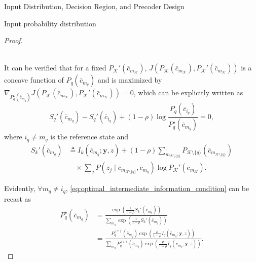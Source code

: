 \documentclass[journal]{IEEEtran}
\begin{document}
\begin{section}{Input Distribution, Decision Region, and Precoder Design}
\begin{subsection}{Input probability distribution}
\begin{proof}
\begin{figure*}[!b]
\begin{align}
						\label{eq:intermediate_information_function}
					\end{align}
				\end{figure*}
				It can be verified that for a fixed $P_{\mathcal{K}}'(\bar{c}_{m_{\mathcal{K}}})$, $J \left( P_{\mathcal{K}}(\bar{c}_{m_{\mathcal{K}}}),P_{\mathcal{K}}'(\bar{c}_{m_{\mathcal{K}}}) \right)$ is a concave function of $P_q(\bar{c}_{m_q})$ and is maximized by $\nabla_{P_q^{\star}(\bar{c}_{m_q})} J \left( P_{\mathcal{K}}(\bar{c}_{m_{\mathcal{K}}}),P_{\mathcal{K}}'(\bar{c}_{m_{\mathcal{K}}}) \right) = 0$, which can be explicitly written as
				\begin{equation}
					S_q'(\bar{c}_{m_q}) - S_q'(\bar{c}_{i_q}) + (1 - \rho) \log \frac{P_q(\bar{c}_{i_q})}{P_q^{\star}(\bar{c}_{m_q})} = 0,
					\label{eq:optimal_intermediate_information_condition}
				\end{equation}
				where $i_q \ne m_q$ is the reference state and
				\begin{align}
					S_k'(\bar{c}_{m_q})
					& \triangleq I_k(\bar{c}_{m_q};\boldsymbol{y},z) + (1 - \rho) \sum_{m_{\mathcal{K} \setminus \{q\}}} P_{\mathcal{K} \setminus \{q\}}(\bar{c}_{m_{\mathcal{K} \setminus \{q\}}})\nonumber\\
					& \quad \times \sum_j P(\bar{z}_j \mid \bar{c}_{m_{\mathcal{K} \setminus \{q\}}},\bar{c}_{m_q}) \log P_{\mathcal{K}}'(\bar{c}_{m_{\mathcal{K}}}).
				\end{align}

				Evidently, $\forall m_q \ne i_q$, \eqref{eq:optimal_intermediate_information_condition} can be recast as
				\begin{subequations}
					\begin{align}
						P_q^{\star}(\bar{c}_{m_q})
						& = \frac{\exp \left( \frac{1}{1 - \rho} S_k'(\bar{c}_{m_q}) \right)}{\sum_{m_q} \exp \left( \frac{1}{1 - \rho} S_k'(\bar{c}_{m_q}) \right)}\\
						& = \frac{P_q^{(r)}(\bar{c}_{m_q}) \exp \left( \frac{\rho}{1 - \rho} I_q(\bar{c}_{m_q};\boldsymbol{y},z) \right)}{\sum_{m_q} P_q^{(r)}(\bar{c}_{m_q}) \exp \left( \frac{\rho}{1 - \rho} I_q(\bar{c}_{m_q};\boldsymbol{y},z) \right)}.
						\label{eq:optimal_relative_distribution}
					\end{align}
				\end{subequations}


\end{proof}
\end{subsection}
\end{section}
\end{document}
